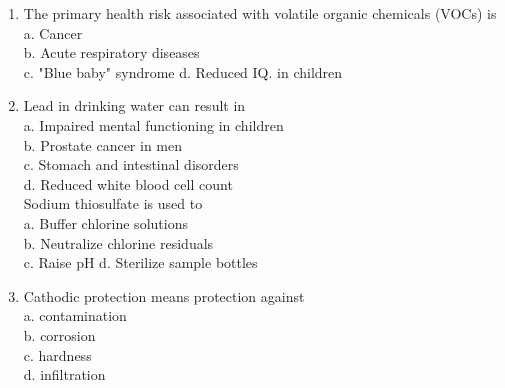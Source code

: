 \begin{enumerate}[1.]
\item The primary health risk associated with volatile organic chemicals (VOCs) is\\
a. Cancer\\
b. Acute respiratory diseases\\
c. "Blue baby" syndrome d. Reduced IQ. in children\\
\item Lead in drinking water can result in\\
a. Impaired mental functioning in children\\
b. Prostate cancer in men\\
c. Stomach and intestinal disorders\\
d. Reduced white blood cell count\\
Sodium thiosulfate is used to\\
a. Buffer chlorine solutions\\
b. Neutralize chlorine residuals\\
c. Raise pH d. Sterilize sample bottles\\
\item Cathodic protection means protection against\\
a. contamination\\
b. corrosion\\
c. hardness\\
d. infiltration\\


\end{enumerate}
